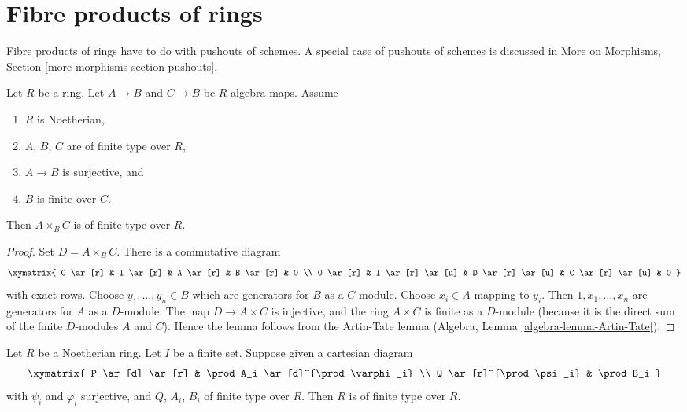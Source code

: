 \section{Fibre products of rings}
\label{section-fibre-products-rings}

\noindent
Fibre products of rings have to do with pushouts of schemes. A special
case of pushouts of schemes is discussed in
More on Morphisms, Section \ref{more-morphisms-section-pushouts}.

\begin{lemma}
\label{lemma-fibre-product-finite-type}
Let $R$ be a ring. Let $A \to B$ and $C \to B$ be $R$-algebra maps.
Assume
\begin{enumerate}
\item $R$ is Noetherian,
\item $A$, $B$, $C$ are of finite type over $R$,
\item $A \to B$ is surjective, and
\item $B$ is finite over $C$.
\end{enumerate}
Then $A \times_B C$ is of finite type over $R$.
\end{lemma}

\begin{proof}
Set $D = A \times_B C$. There is a commutative diagram
$$
\xymatrix{
0 \ar[r] &
I \ar[r] &
A \ar[r] &
B \ar[r] &
0 \\
0 \ar[r] &
I \ar[r] \ar[u] &
D \ar[r] \ar[u] &
C \ar[r] \ar[u] &
0
}
$$
with exact rows. Choose $y_1, \ldots, y_n \in B$ which are generators for
$B$ as a $C$-module. Choose $x_i \in A$ mapping to $y_i$.
Then $1, x_1, \ldots, x_n$ are generators for $A$ as a $D$-module.
The map $D \to A \times C$ is injective, and the ring $A \times C$ is finite
as a $D$-module (because it is the direct sum of the finite $D$-modules
$A$ and $C$). Hence the lemma follows from the Artin-Tate lemma
(Algebra, Lemma \ref{algebra-lemma-Artin-Tate}).
\end{proof}

\begin{lemma}
\label{lemma-formal-consequence}
Let $R$ be a Noetherian ring. Let $I$ be a finite set. Suppose given a
cartesian diagram
$$
\xymatrix{
P \ar[d] \ar[r] & \prod A_i \ar[d]^{\prod \varphi_i} \\
Q \ar[r]^{\prod \psi_i} & \prod B_i
}
$$
with $\psi_i$ and $\varphi_i$ surjective, and $Q$, $A_i$, $B_i$ of
finite type over $R$. Then $R$ is of finite type over $R$.
\end{lemma}

